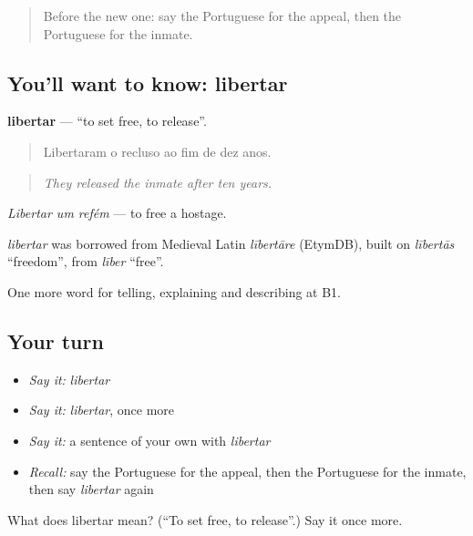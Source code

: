 \label{lesson:PT-C298-libertar}



\begin{quote}
Before the new one: say the Portuguese for the appeal, then the Portuguese for the inmate.
\end{quote}

\subsection*{You'll want to know: libertar}
\textbf{libertar} — \textquotedblleft{}to set free, to release\textquotedblright{}.

\begin{quote}
Libertaram o recluso ao fim de dez anos.
\end{quote}

\begin{quote}
\emph{They released the inmate after ten years.}
\end{quote}

\emph{Libertar um refém} — to free a hostage.

\begin{cousinweb}
\emph{libertar} was borrowed from Medieval Latin \emph{lībertāre} (EtymDB), built on \emph{lībertās} \textquotedblleft{}freedom\textquotedblright{}, from \emph{līber} \textquotedblleft{}free\textquotedblright{}.
\end{cousinweb}

\begin{grammarlens}[title={What you've built}]
One more word for telling, explaining and describing at B1.
\end{grammarlens}

\subsection*{Your turn}
\begin{itemize}
\raggedright
  \item \emph{Say it:} \emph{libertar}
  \item \emph{Say it:} \emph{libertar}, once more
  \item \emph{Say it:} a sentence of your own with \emph{libertar}
  \item \emph{Recall:} say the Portuguese for the appeal, then the Portuguese for the inmate, then say \emph{libertar} again
\end{itemize}

\begin{tcolorbox}[breakable,colback=teal!4,colframe=teal!35!black,title={Before you move on}]
What does libertar mean? (\textquotedblleft{}To set free, to release\textquotedblright{}.) Say it once more.
\end{tcolorbox}
